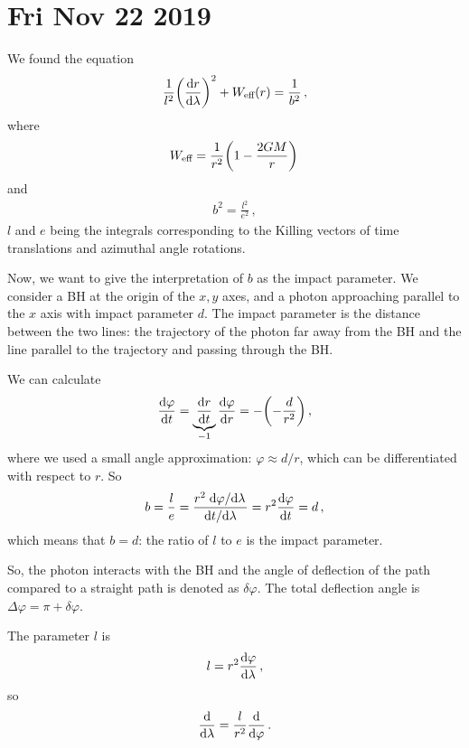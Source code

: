 \documentclass[main.tex]{subfiles}
\begin{document}
\section*{Fri Nov 22 2019}

We found the equation 
%
\begin{align}
  \frac{1}{l^2} \qty(\dv{r}{\lambda })^2 + W _{\text{eff}}(r) = \frac{1}{b^2}
\,,
\end{align}
%
where 
%
\begin{align}
  W _{\text{eff}} = \frac{1}{r^2} \qty(1 - \frac{2GM}{r})
\,
\end{align}
%
and 
%
\begin{align}
  b^2 = \frac{l^2}{e^2}
\,,
\end{align}
%
\(l\) and \(e\) being the integrals corresponding to the Killing vectors of time translations and azimuthal angle rotations. 

Now, we want to give the interpretation of \(b\) as the impact parameter. 
We consider a BH at the origin of the \(x, y\) axes, and a photon approaching parallel to the \(x\) axis with impact parameter \(d\). The impact parameter is the distance between the two lines: the trajectory of the photon far away from the BH and the line parallel to the trajectory and passing through the BH. 

We can calculate 
%
\begin{align}
  \dv{\varphi }{t} = \underbrace{\dv{r}{t}}_{-1} \dv{\varphi }{r} = - \qty(-\frac{d}{r^2})
\,,
\end{align}
%
where we used a small angle approximation: \(\varphi \approx d/r\), which can be differentiated with respect to \(r\). 
So 
%
\begin{align}
  b = \frac{l}{e} = \frac{r^2 \dv*{\varphi }{\lambda }}{\dv*{t}{\lambda }} = r^2 \dv{\varphi }{t} = d 
\,,
\end{align}
%
which means that \(b=d\): the ratio of \(l\) to \(e\) is the impact parameter. 

So, the photon interacts with the BH and the angle of deflection of the path compared to a straight path is denoted as \(\delta \varphi \). 
The total deflection angle is \(\Delta \varphi  = \pi + \delta \varphi \). 

The parameter \(l\) is 
%
\begin{align}
  l = r^2 \dv{\varphi }{\lambda } 
\,,
\end{align}
%
so 
%
\begin{align}
  \dv{}{\lambda } = \frac{l}{r^2} \dv{}{\varphi }
\,.
\end{align}
\end{document}
